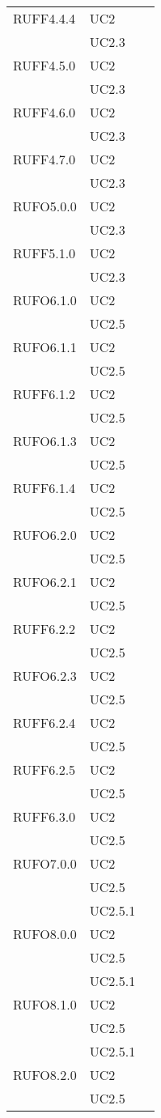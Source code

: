 \begin{center}
\begin{longtable}{lp{}l}
RUFF4.4.4 & UC2 \\
 & UC2.3 \\
RUFF4.5.0 & UC2 \\
 & UC2.3 \\
RUFF4.6.0 & UC2 \\
 & UC2.3 \\
RUFF4.7.0 & UC2 \\
 & UC2.3 \\
RUFO5.0.0 & UC2 \\
 & UC2.3 \\
RUFF5.1.0 & UC2 \\
 & UC2.3 \\
RUFO6.1.0 & UC2 \\
 & UC2.5 \\
RUFO6.1.1 & UC2 \\
 & UC2.5 \\
RUFF6.1.2 & UC2 \\
 & UC2.5 \\
RUFO6.1.3 & UC2 \\
 & UC2.5 \\
RUFF6.1.4 & UC2 \\
 & UC2.5 \\
RUFO6.2.0 & UC2 \\
 & UC2.5 \\
RUFO6.2.1 & UC2 \\
 & UC2.5 \\
RUFF6.2.2 & UC2 \\
 & UC2.5 \\
RUFO6.2.3 & UC2 \\
 & UC2.5 \\
RUFF6.2.4 & UC2 \\
 & UC2.5 \\
RUFF6.2.5 & UC2 \\
 & UC2.5 \\
RUFF6.3.0 & UC2 \\
 & UC2.5 \\
RUFO7.0.0 & UC2 \\
 & UC2.5 \\
 & UC2.5.1 \\
RUFO8.0.0 & UC2 \\
 & UC2.5 \\
 & UC2.5.1 \\
RUFO8.1.0 & UC2 \\
 & UC2.5 \\
 & UC2.5.1 \\
RUFO8.2.0 & UC2 \\
 & UC2.5 \\

\end{longtable}
\end{center}
